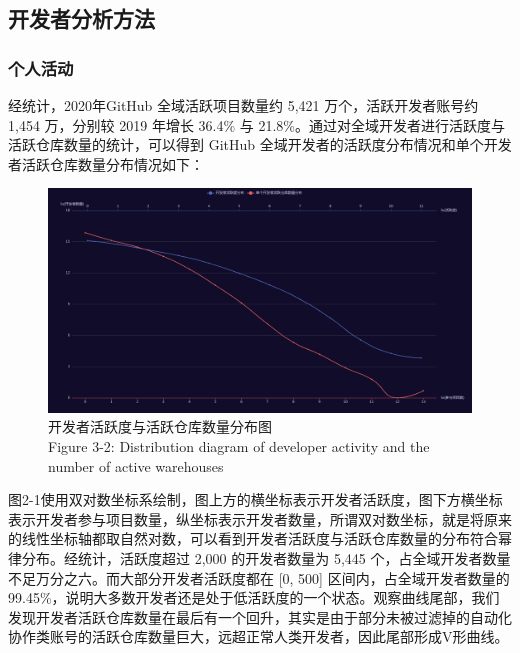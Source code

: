 
\subsection{开发者分析方法}
\subsubsection{个人活动}

\par 经统计，2020年GitHub 全域活跃项目数量约 5,421 万个，活跃开发者账号约 1,454 万，分别较 2019 年增长 36.4\% 与 21.8\%。通过对全域开发者进行活跃度与活跃仓库数量的统计，可以得到 GitHub 全域开发者的活跃度分布情况和单个开发者活跃仓库数量分布情况如下：
\begin{figure}[H]
    \centering
    \includegraphics[width=130mm]{./figures/image2-1.png}
    \caption{开发者活跃度与活跃仓库数量分布图\\Figure 3-2: Distribution diagram of developer activity and the number of active warehouses}
\end{figure}

\par 图2-1使用双对数坐标系绘制，图上方的横坐标表示开发者活跃度，图下方横坐标表示开发者参与项目数量，纵坐标表示开发者数量，所谓双对数坐标，就是将原来的线性坐标轴都取自然对数，可以看到开发者活跃度与活跃仓库数量的分布符合幂律分布。经统计，活跃度超过 2,000 的开发者数量为 5,445 个，占全域开发者数量不足万分之六。而大部分开发者活跃度都在 [0, 500] 区间内，占全域开发者数量的 99.45\%，说明大多数开发者还是处于低活跃度的一个状态。观察曲线尾部，我们发现开发者活跃仓库数量在最后有一个回升，其实是由于部分未被过滤掉的自动化协作类账号的活跃仓库数量巨大，远超正常人类开发者，因此尾部形成V形曲线。






